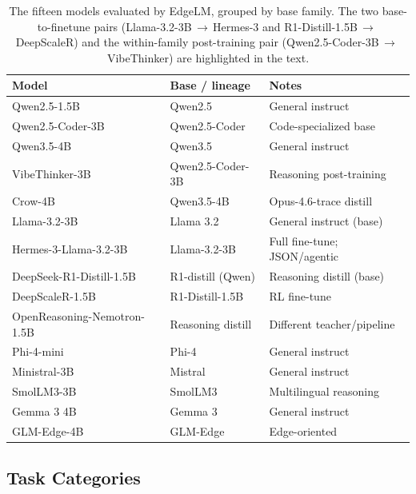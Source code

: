 \documentclass[runningheads]{llncs}
\begin{document}
\begin{table}[t]
\caption{The fifteen models evaluated by EdgeLM, grouped by base family. The two
base-to-finetune pairs (Llama-3.2-3B\,$\rightarrow$\,Hermes-3 and
R1-Distill-1.5B\,$\rightarrow$\,DeepScaleR) and the within-family post-training
pair (Qwen2.5-Coder-3B\,$\rightarrow$\,VibeThinker) are highlighted in the text.}
\label{tab:models}
\centering
\footnotesize
\begin{tabular}{@{}lll@{}}
\toprule
Model & Base / lineage & Notes \\
\midrule
Qwen2.5-1.5B            & Qwen2.5            & General instruct \\
Qwen2.5-Coder-3B        & Qwen2.5-Coder      & Code-specialized base \\
Qwen3.5-4B              & Qwen3.5            & General instruct \\
VibeThinker-3B          & Qwen2.5-Coder-3B   & Reasoning post-training \\
Crow-4B                 & Qwen3.5-4B         & Opus-4.6-trace distill \\
\midrule
Llama-3.2-3B            & Llama 3.2          & General instruct (base) \\
Hermes-3-Llama-3.2-3B   & Llama-3.2-3B       & Full fine-tune; JSON/agentic \\
\midrule
DeepSeek-R1-Distill-1.5B & R1-distill (Qwen) & Reasoning distill (base) \\
DeepScaleR-1.5B         & R1-Distill-1.5B    & RL fine-tune \\
OpenReasoning-Nemotron-1.5B & Reasoning distill & Different teacher/pipeline \\
\midrule
Phi-4-mini              & Phi-4              & General instruct \\
Ministral-3B            & Mistral            & General instruct \\
SmolLM3-3B              & SmolLM3            & Multilingual reasoning \\
Gemma 3 4B              & Gemma 3            & General instruct \\
GLM-Edge-4B             & GLM-Edge           & Edge-oriented \\
\bottomrule
\end{tabular}
\end{table}

\subsection{Task Categories}
\label{sec:method}
\end{document}

